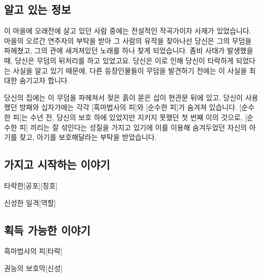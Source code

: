 \documentclass{report}
\begin{document}
	\subsection*{알고 있는 정보}
		이 마을에 오래전에 살고 있던 사람 중에는 전설적인 작곡가이자 사제가 있었습니다. 마을의 오르간 연주자의 부탁을 받아 그 사람의 유작을 찾아나선 당신은 그의 무덤을 파헤쳤고, 그의 관에 새겨져있던 노래를 하나 찾게 되었습니다. 좀비 사태가 발생했을 때, 당신은 무덤의 뒤처리를 하고 있었고요. 당신은 이로 인해 당신이 타락하게 되었다는 사실을 알고 있기 때문에, 다른 등장인물들이 무덤을 발견하기 전에는 이 사실을 최대한 숨기고자 합니다.
		
		당신의 집에는 이 무덤을 파헤쳐서 젖은 흙이 묻은 삽이 현관문 뒤에 있고, 당신이 사용했던 방패와 십자가에는 각각 [흑마법사의 피]와 [순수한 피]가 숨겨져 있습니다. [순수한 피]는 수년 전, 당신의 보호 하에 있었지만 지키지 못했던 첫 번째 이의 것으로, [순수한 피] 끼리는 잘 섞인다는 성질을 가지고 있기에 이를 이용해 숨겨두었던 자신의 아기를 찾고, 아기를 보호해달라는 부탁을 받았습니다.
	
	\subsection*{가지고 시작하는 이야기}
		\begin{spoiler}{타락한}{[공포][칭호]}
			
		\end{spoiler}
		
		\begin{spoiler}{신성한 일격}{[역할]}
		\end{spoiler}
	
	\subsection*{획득 가능한 이야기}
		\begin{spoiler}{흑마법사의 피}{[타락]}
		\end{spoiler}
		
		\begin{spoiler}{권능의 보호막}{[신성]}
			
		\end{spoiler}
\end{document}
